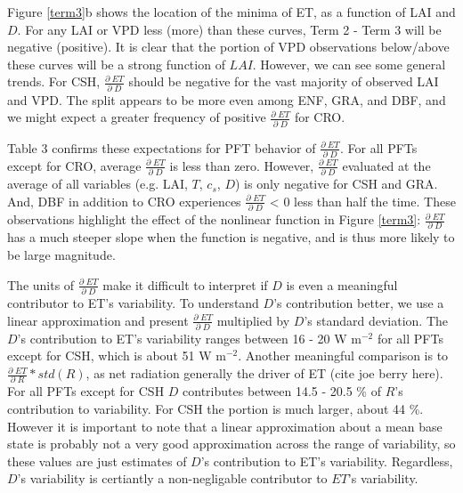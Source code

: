 \documentclass[draft,linenumbers]{agujournal}
\begin{document}
Figure \ref{term3}b shows the location of the minima of ET, as a function of LAI and $D$. For any LAI or VPD less (more) than these curves, Term 2 - Term 3 will be negative (positive). It is clear that the portion of VPD observations below/above these curves will be a strong function of $LAI$. However, we can see some general trends. For CSH, $\frac{\partial \; ET}{\partial \; D}$ should be negative for the vast majority of observed LAI and VPD. The split appears to be more even among ENF, GRA, and DBF, and we might expect a greater frequency of positive $\frac{\partial \; ET}{\partial \; D}$ for CRO. 

Table 3 confirms these expectations for PFT behavior of $\frac{\partial \; ET}{\partial \; D}$. For all PFTs except for CRO, average $\frac{\partial \; ET}{\partial \; D}$ is less than zero. However, $\frac{\partial \; ET}{\partial \; D}$ evaluated at the average of all variables (e.g. LAI, $T$, $c_s$, $D$) is only negative for CSH and GRA. And, DBF in addition to CRO experiences $\frac{\partial \; ET}{\partial \; D}$ < 0 less than half the time. These observations highlight the effect of the nonlinear function in Figure \ref{term3}: $\frac{\partial \; ET}{\partial \; D}$ has a much steeper slope when the function is negative, and is thus more likely to be large magnitude.

The units of $\frac{\partial \; ET}{\partial \; D}$ make it difficult to interpret if $D$ is even a meaningful contributor to ET's variability. To understand $D$'s contribution better, we use a linear approximation and present $\frac{\partial \; ET}{\partial \; D}$ multiplied by $D$'s standard deviation. The $D$'s contribution to ET's variability ranges between 16 - 20 W m$^{-2}$ for all PFTs except for CSH, which is about 51 W m$^{-2}$. Another meaningful comparison is to $\frac{\partial \; ET}{\partial \; R} * std(R)$, as net radiation generally the driver of ET (cite joe berry here). For all PFTs except for CSH $D$ contributes between 14.5 - 20.5 \% of $R$'s contribution to variability. For CSH the portion is much larger, about 44 \%. However it is important to note that a linear approximation about a mean base state is probably not a very good approximation across the range of variability, so these values are just estimates of $D$'s contribution to ET's variability. Regardless, $D$'s variability is certiantly a non-negligable contributor to $ET$'s variability.
\end{document}
